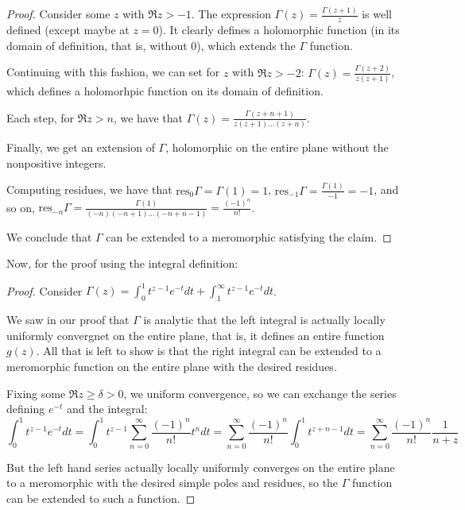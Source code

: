 \documentclass[11pt]{article} %
\theoremstyle{definition}
\newcommand{\res}{\text{res}}
\begin{document}
\begin{proof}
Consider some $z$ with $\Re z > -1$. The expression $\Gamma\left(z\right) = \frac{\Gamma\left(z+1\right)}{z}$ is well defined (except maybe at $z = 0$). It clearly defines a holomorphic function (in its domain of definition, that is, without $0$), which extends the $\Gamma$ function.

Continuing with this fashion, we can set for $z$ with $\Re z > -2$: $\Gamma\left(z\right) = \frac{\Gamma\left(z+2\right)}{z\left(z+1\right)}$, which defines a holomorhpic function on its domain of definition.

Each step, for $\Re z > n$, we have that $\Gamma\left(z\right) = \frac{\Gamma\left(z + n + 1\right)}{z\left(z+1\right)\dots\left(z + n\right)}$.

Finally, we get an extension of $\Gamma$, holomorphic on the entire plane without the nonpositive integers.

Computing residues, we have that $\res_0 \Gamma = \Gamma\left(1\right) = 1$, $\res_{-1}\Gamma = \frac{\Gamma\left(1\right)}{-1} = -1$, and so on, $\res_{-n}\Gamma= \frac{\Gamma\left(1\right)}{\left(-n\right)\left(-n+1\right)\dots\left(-n+n-1\right)} = \frac{\left(-1\right)^n}{n!}$.

We conclude that $\Gamma$ can be extended to a meromorphic satisfying the claim.
\end{proof}

Now, for the proof using the integral definition:

\begin{proof}
Consider $\Gamma\left(z\right) = \int_0 ^1 t^{z-1}e^{-t}dt + \int_1^\infty t^{z-1}e^{-t}dt$.

We saw in our proof that $\Gamma$ is analytic that the left integral is actually locally uniformly convergnet on the entire plane, that is, it defines an entire function $g\left(z\right)$. All that is left to show is that the right integral can be extended to a meromorphic function on the entire plane with the desired residues.

Fixing some $\Re z \geq \delta >0$, we uniform convergence, so we can exchange the series defining $e^{-t}$ and the integral:
\[ \int_0 ^1 t^{z-1} e^{-t} dt = \int _0 ^1 t^{z-1} \sum_{n=0}^\infty \frac{\left(-1\right)^n}{n!} t^n dt = \sum_{n=0}^\infty \frac{\left(-1\right)^n}{n!} \int_0^1 t^{z+n-1}dt = \sum_{n=0}^\infty \frac{\left(-1\right)^n}{n!}\frac{1}{n+z} \]

But the left hand series actually locally uniformly converges on the entire plane to a meromorphic with the desired simple poles and residues, so the $\Gamma$ function can be extended to such a function.
\end{proof}
\end{document}

